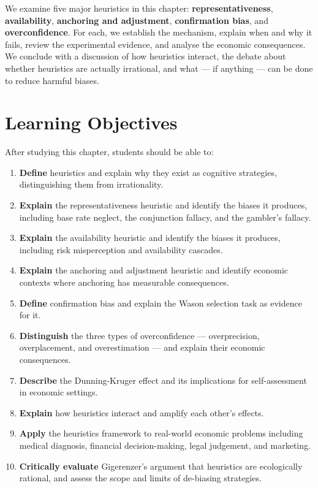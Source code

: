 \documentclass[12pt, letterpaper]{article}
\begin{document}
We examine five major heuristics in this chapter: \textbf{representativeness}, \textbf{availability}, \textbf{anchoring and adjustment}, \textbf{confirmation bias}, and \textbf{overconfidence}. For each, we establish the mechanism, explain when and why it fails, review the experimental evidence, and analyse the economic consequences. We conclude with a discussion of how heuristics interact, the debate about whether heuristics are actually irrational, and what --- if anything --- can be done to reduce harmful biases.

\newpage


\section*{Learning Objectives}


After studying this chapter, students should be able to:

\begin{enumerate}
\item \textbf{Define} heuristics and explain why they exist as cognitive strategies, distinguishing them from irrationality.
\item \textbf{Explain} the representativeness heuristic and identify the biases it produces, including base rate neglect, the conjunction fallacy, and the gambler's fallacy.
\item \textbf{Explain} the availability heuristic and identify the biases it produces, including risk misperception and availability cascades.
\item \textbf{Explain} the anchoring and adjustment heuristic and identify economic contexts where anchoring has measurable consequences.
\item \textbf{Define} confirmation bias and explain the Wason selection task as evidence for it.
\item \textbf{Distinguish} the three types of overconfidence --- overprecision, overplacement, and overestimation --- and explain their economic consequences.
\item \textbf{Describe} the Dunning-Kruger effect and its implications for self-assessment in economic settings.
\item \textbf{Explain} how heuristics interact and amplify each other's effects.
\item \textbf{Apply} the heuristics framework to real-world economic problems including medical diagnosis, financial decision-making, legal judgement, and marketing.
\item \textbf{Critically evaluate} Gigerenzer's argument that heuristics are ecologically rational, and assess the scope and limits of de-biasing strategies.
\end{enumerate}
\end{document}
